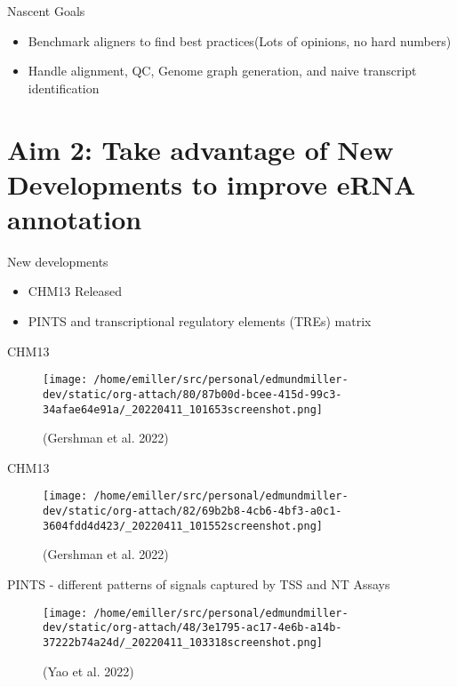 \documentclass[bigger]{beamer}
\begin{document}
\begin{frame}[label={sec:orgb93af4b}]{Nascent Goals}
\begin{itemize}
\item Benchmark aligners to find best practices(Lots of opinions, no hard numbers)
\item Handle alignment, QC, Genome graph generation, and naive transcript
identification
\end{itemize}
\end{frame}

\section*{Aim 2: Take advantage of New Developments to improve eRNA annotation}
\label{sec:orgee4e2df}
\begin{frame}[label={sec:orgf08ce5f}]{New developments}
\begin{itemize}
\item CHM13 Released
\item PINTS and transcriptional regulatory elements (TREs) matrix
\end{itemize}
\end{frame}

\begin{frame}[label={sec:org1a0363b}]{CHM13}
\begin{figure}[htbp]
\centering
\texttt{[image: /home/emiller/src/personal/edmundmiller-dev/static/org-attach/80/87b00d-bcee-415d-99c3-34afae64e91a/\_20220411\_101653screenshot.png]}
\caption{(Gershman et al. 2022)}
\end{figure}
\end{frame}

\begin{frame}[label={sec:org95a07aa}]{CHM13}
\begin{figure}[htbp]
\centering
\texttt{[image: /home/emiller/src/personal/edmundmiller-dev/static/org-attach/82/69b2b8-4cb6-4bf3-a0c1-3604fdd4d423/\_20220411\_101552screenshot.png]}
\caption{(Gershman et al. 2022)}
\end{figure}
\end{frame}



\begin{frame}[label={sec:org65af9fa}]{PINTS - different patterns of signals captured by TSS and NT Assays}
\begin{figure}[htbp]
\centering
\texttt{[image: /home/emiller/src/personal/edmundmiller-dev/static/org-attach/48/3e1795-ac17-4e6b-a14b-37222b74a24d/\_20220411\_103318screenshot.png]}
\caption{(Yao et al. 2022)}
\end{figure}
\end{frame}
\end{document}
